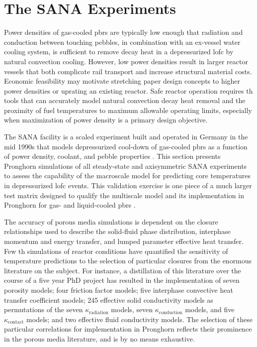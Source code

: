 \chapter{The SANA Experiments}
\label{sec:sana}

Power densities of gas-cooled \glspl{pbr} are typically low enough that radiation and conduction between touching pebbles, in combination with an ex-vessel water cooling system, is sufficient to remove decay heat in a depressurized \gls{lofc} by natural convection cooling. However, low power densities result in larger reactor vessels that both complicate rail transport and increase structural material costs. Economic feasibility may motivate stretching paper design concepts to higher power densities or uprating an existing reactor. Safe reactor operation requires \gls{th} tools that can accurately model natural convection decay heat removal and the proximity of fuel temperatures to maximum allowable operating limits, especially when maximization of power density is a primary design objective. 


The SANA facility is a scaled experiment built and operated in Germany in the mid 1990s that models depressurized cool-down of gas-cooled \glspl{pbr} as a function of power density, coolant, and pebble properties \cite{SANA}. This section presents Pronghorn simulations of all steady-state and axisymmetric SANA experiments to assess the capability of the macroscale model for predicting core temperatures in depressurized \gls{lofc} events. This validation exercise is one piece of a much larger test matrix designed to qualify the multiscale model and its implementation in Pronghorn for gas- and liquid-cooled \glspl{pbr} \cite{ph_plan}.

The accuracy of porous media simulations is dependent on the closure relationships used to describe the solid-fluid phase distribution, interphase momentum and energy transfer, and lumped parameter effective heat transfer. Few \gls{th} simulations of reactor conditions have quantified the sensitivity of temperature predictions to the selection of particular closures from the enormous literature on the subject. For instance, a distillation of this literature over the course of a five year PhD project has resulted in the implementation of seven porosity models; four friction factor models; five interphase convective heat transfer coefficient models; 245 effective solid conductivity models as permutations of the seven \(\kappa_\text{radiation}\) models, seven \(\kappa_\text{conduction}\) models, and five \(\kappa_\text{contact}\) models; and two effective fluid conductivity models. The selection of these particular correlations for implementation in Pronghorn reflects their prominence in the porous media literature, and is by no means exhaustive. 

